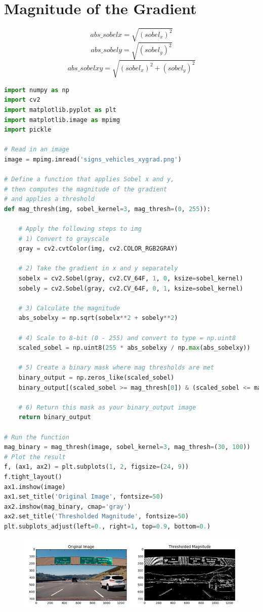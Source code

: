 \documentclass[12pt]{article}
\begin{document}
\section{Magnitude of the Gradient}

$$abs\_sobelx = \sqrt{(sobel_x)^2}$$
$$abs\_sobely = \sqrt{(sobel_y)^2}$$
$$abs\_sobelxy = \sqrt{(sobel_x)^2 + (sobel_y)^2}$$

\begin{lstlisting}[language=Python]
import numpy as np
import cv2
import matplotlib.pyplot as plt
import matplotlib.image as mpimg
import pickle

# Read in an image
image = mpimg.imread('signs_vehicles_xygrad.png')

# Define a function that applies Sobel x and y, 
# then computes the magnitude of the gradient
# and applies a threshold
def mag_thresh(img, sobel_kernel=3, mag_thresh=(0, 255)):
    
    # Apply the following steps to img
    # 1) Convert to grayscale
    gray = cv2.cvtColor(img, cv2.COLOR_RGB2GRAY)
    
    # 2) Take the gradient in x and y separately
    sobelx = cv2.Sobel(gray, cv2.CV_64F, 1, 0, ksize=sobel_kernel)
    sobely = cv2.Sobel(gray, cv2.CV_64F, 0, 1, ksize=sobel_kernel)
    
    # 3) Calculate the magnitude 
    abs_sobelxy = np.sqrt(sobelx**2 + sobely**2)
    
    # 4) Scale to 8-bit (0 - 255) and convert to type = np.uint8
    scaled_sobel = np.uint8(255 * abs_sobelxy / np.max(abs_sobelxy))
    
    # 5) Create a binary mask where mag thresholds are met
    binary_output = np.zeros_like(scaled_sobel)
    binary_output[(scaled_sobel >= mag_thresh[0]) & (scaled_sobel <= mag_thresh[1])] = 1
    
    # 6) Return this mask as your binary_output image
    return binary_output
    
# Run the function
mag_binary = mag_thresh(image, sobel_kernel=3, mag_thresh=(30, 100))
# Plot the result
f, (ax1, ax2) = plt.subplots(1, 2, figsize=(24, 9))
f.tight_layout()
ax1.imshow(image)
ax1.set_title('Original Image', fontsize=50)
ax2.imshow(mag_binary, cmap='gray')
ax2.set_title('Thresholded Magnitude', fontsize=50)
plt.subplots_adjust(left=0., right=1, top=0.9, bottom=0.)
\end{lstlisting}

\begin{figure}[htp]
    \centering
    \includegraphics[width=15cm]{magnitute_gradient.png}
    \label{fig:magnitute_gradient}
\end{figure}
\end{document}
